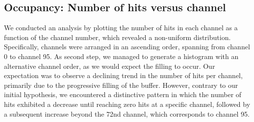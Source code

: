 \subsection{Occupancy: Number of hits versus channel}
We conducted an analysis by plotting the number of hits in each channel as a function of the channel number, which revealed a non-uniform distribution. 
Specifically, channels were arranged in an ascending order, spanning from channel 0 to channel 95.
As second step, we managed to generate a histogram with an alternative channel order, as we would expect the filling to occur.
Our expectation was to observe a declining trend in the number of hits per channel, primarily due to the progressive filling of the buffer. 
However, contrary to our initial hypothesis, we encountered a distinctive pattern in which the number of hits exhibited a decrease until reaching zero hits at a specific channel,
followed by a subsequent increase beyond the 72nd channel, which corresponds to channel 95.


